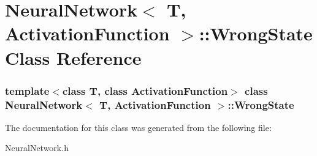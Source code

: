\hypertarget{class_neural_network_1_1_wrong_state}{\section{\-Neural\-Network$<$ \-T, \-Activation\-Function $>$\-:\-:\-Wrong\-State \-Class \-Reference}
\label{class_neural_network_1_1_wrong_state}
}
\subsubsection*{template$<$class T, class Activation\-Function$>$ class Neural\-Network$<$ T, Activation\-Function $>$\-::\-Wrong\-State}



\-The documentation for this class was generated from the following file\-:\begin{DoxyCompactItemize}
\item 
\-Neural\-Network.\-h\end{DoxyCompactItemize}
